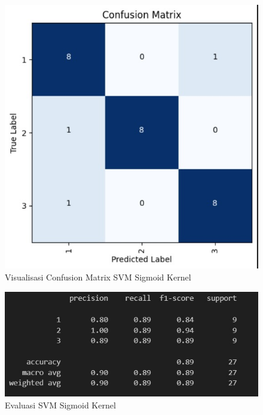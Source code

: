 \begin{figure} [H] \centering
  \includegraphics[scale=0.65]{gambar/cfpsigmoid.jpg}
  \caption{Visualisasi Confusion Matrix SVM Sigmoid Kernel}
  \label{fig:evalcfpsigmoidkernel}
\end{figure}

\begin{figure} [H] \centering
  \includegraphics[scale=0.65]{gambar/evalsigmoid.jpg}
  \caption{Evaluasi SVM Sigmoid Kernel}
  \label{fig:evalsigmoidkernel}
\end{figure}


